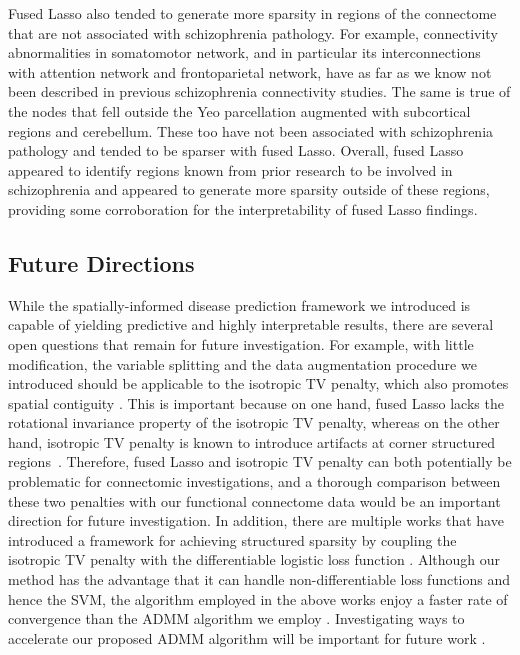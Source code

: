 Fused Lasso also tended to generate more sparsity in regions of the connectome that are not associated with schizophrenia pathology. 
For example, connectivity abnormalities in somatomotor network, and in particular its interconnections with attention network and frontoparietal network, have as far as we know not been described in previous schizophrenia connectivity studies. 
The same is true of the nodes that fell outside the Yeo parcellation augmented with subcortical regions and cerebellum. 
These too have not been associated with schizophrenia pathology and tended to be sparser with fused Lasso. 
Overall, fused Lasso appeared to identify regions known from prior research to be involved in schizophrenia and appeared to generate more sparsity outside of these regions, providing some corroboration for the interpretability of fused Lasso findings.

\subsection{Future Directions}
While the spatially-informed disease prediction framework we introduced is capable of yielding predictive and highly interpretable results, there are several open questions that remain for future investigation.
For example, with little modification, the variable splitting and the data augmentation procedure we introduced should be applicable to the isotropic TV penalty, which also promotes spatial contiguity \citep{Wang:2008tv}.
This is important because on one hand, fused Lasso lacks the rotational invariance property of the isotropic TV penalty, whereas on the other hand, isotropic TV penalty is known to introduce artifacts at corner structured regions~\citep{Birkholz:2011,Grasmair:2010}.
Therefore, fused Lasso and isotropic TV penalty can both potentially be problematic for connectomic investigations, and a thorough comparison between these two penalties with our functional connectome data would be an important direction for future investigation.
In addition, there are multiple works that have introduced a framework for achieving structured sparsity by coupling the isotropic TV penalty with the differentiable logistic loss function \citep{Gramfort:2013, Baldassarre:2012,Michel:2011}.
Although our method has the advantage that it can handle non-differentiable loss functions and hence the SVM, the algorithm employed in the above works enjoy a faster rate of convergence than the ADMM algorithm we employ \citep{He:2012,Beck:2009}.
Investigating ways to accelerate our proposed ADMM algorithm will be important for future work  \citep{Deng:2012, Goldstein:2012}.

